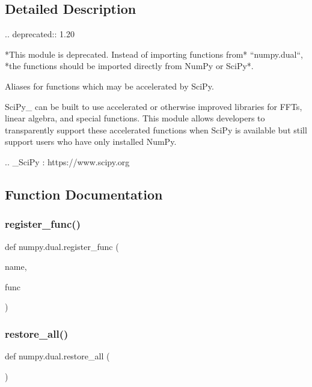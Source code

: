 \subsection{Detailed Description}
\begin{DoxyVerb}.. deprecated:: 1.20

*This module is deprecated.  Instead of importing functions from*
``numpy.dual``, *the functions should be imported directly from NumPy
or SciPy*.

Aliases for functions which may be accelerated by SciPy.

SciPy_ can be built to use accelerated or otherwise improved libraries
for FFTs, linear algebra, and special functions. This module allows
developers to transparently support these accelerated functions when
SciPy is available but still support users who have only installed
NumPy.

.. _SciPy : https://www.scipy.org\end{DoxyVerb}
 

\subsection{Function Documentation}
\mbox{\label{namespacenumpy_1_1dual_aaeb5847bc14cfd25af96706900b19acd}} 
\subsubsection{\texorpdfstring{register\+\_\+func()}{register\_func()}}
{\footnotesize\ttfamily def numpy.\+dual.\+register\+\_\+func (\begin{DoxyParamCaption}\item[{}]{name,  }\item[{}]{func }\end{DoxyParamCaption})}

\mbox{\label{namespacenumpy_1_1dual_a72f240d5e1340a3f0cb6faddf559e5f7}} 
\subsubsection{\texorpdfstring{restore\+\_\+all()}{restore\_all()}}
{\footnotesize\ttfamily def numpy.\+dual.\+restore\+\_\+all (\begin{DoxyParamCaption}{ }\end{DoxyParamCaption})}

